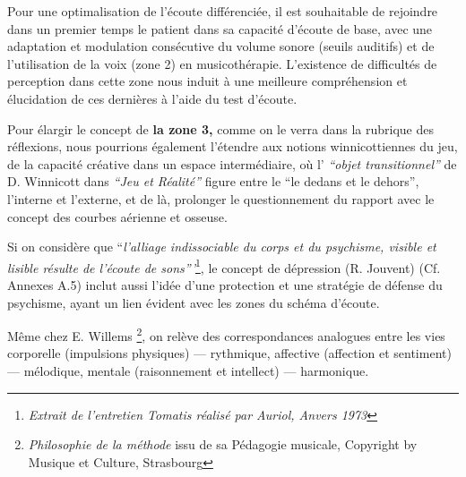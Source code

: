                             Pour une optimalisation de l'écoute différenciée, il est souhaitable
                            de rejoindre dans un premier temps  le patient dans sa capacité
                            d'écoute de base, avec une adaptation et modulation consécutive du
                            volume sonore (seuils auditifs) et de l'utilisation de la voix (zone
                            2) en musicothérapie.
                            L'existence de difficultés de perception dans cette zone nous
                            induit à une meilleure compréhension et  élucidation de ces dernières à l'aide du
                            test d'écoute.

                            Pour élargir le concept de\textbf{ la zone 3,} comme on le
                            verra dans la rubrique des réflexions, nous pourrions
                            également l'étendre aux notions winnicottiennes du jeu, de la capacité
                            créative dans un espace
                            intermédiaire, où l' \textit{``objet
                            transitionnel'' } de D. Winnicott dans \textit{``Jeu et Réalité''}
                            \autocite{winnicott}
                            figure entre le ``le
                            dedans et le
                            dehors'',
                            l'interne et l'externe, et de là,  prolonger le questionnement du
                            rapport avec le concept des
                            courbes aérienne et osseuse.



                            Si on considère que ``\emph{l'alliage indissociable du corps et du psychisme,
                            visible et lisible résulte de l'écoute de
                            sons'''}\footnote{\emph{Extrait de l'entretien Tomatis réalisé par
                              Auriol, Anvers 1973}}, le concept de dépression (R. Jouvent) \autocite{doronparot} (Cf. Annexes
                            A.5) inclut aussi l'idée d'une protection et une stratégie de
                            défense du psychisme, ayant un lien évident avec les zones du schéma d'écoute.

                            Même chez E. Willems \autocite{willems} \footnote{\textit{Philosophie de la méthode} issu de sa
                            Pédagogie musicale, Copyright by Musique et Culture, Strasbourg}, on relève des correspondances analogues entre les vies
                            corporelle (impulsions physiques)
                            --- rythmique, affective (affection et sentiment) --- mélodique, mentale
                            (raisonnement et intellect) --- harmonique.


